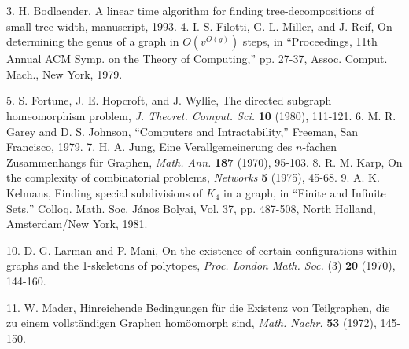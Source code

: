 3. H. Bodlaender, A linear time algorithm for finding tree-decompositions of small tree-width, manuscript, 1993. 4. I. S. Filotti, G. L. Miller, and J. Reif, On determining the genus of a graph in $O(v^{O(g)})$ steps, in ``Proceedings, 11th Annual ACM Symp. on the Theory of Computing,'' pp. 27-37, Assoc. Comput. Mach., New York, 1979.

5. S. Fortune, J. E. Hopcroft, and J. Wyllie, The directed subgraph homeomorphism problem, \textit{J. Theoret. Comput. Sci.} \textbf{10} (1980), 111-121. 6. M. R. Garey and D. S. Johnson, ``Computers and Intractability,'' Freeman, San Francisco, 1979. 7. H. A. Jung, Eine Verallgemeinerung des $n$-fachen Zusammenhangs f\"ur Graphen, \textit{Math. Ann.} \textbf{187} (1970), 95-103. 8. R. M. Karp, On the complexity of combinatorial problems, \textit{Networks} \textbf{5} (1975), 45-68. 9. A. K. Kelmans, Finding special subdivisions of $K_4$ in a graph, in ``Finite and Infinite Sets,'' Colloq. Math. Soc. J\'anos Bolyai, Vol. 37, pp. 487-508, North Holland, Amsterdam/New York, 1981.

10. D. G. Larman and P. Mani, On the existence of certain configurations within graphs and the 1-skeletons of polytopes, \textit{Proc. London Math. Soc.} (3) \textbf{20} (1970), 144-160.

11. W. Mader, Hinreichende Bedingungen f\"ur die Existenz von Teilgraphen, die zu einem vollst\"andigen Graphen hom\"oomorph sind, \textit{Math. Nachr.} \textbf{53} (1972), 145-150.

